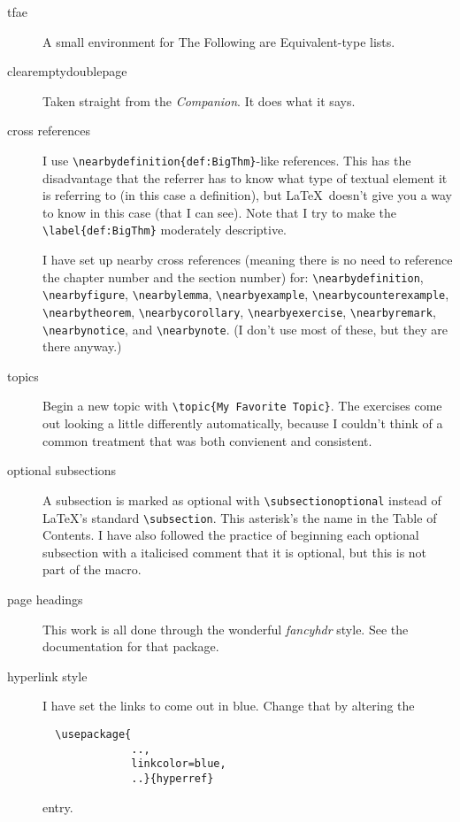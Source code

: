 \documentclass[titlepage]{article}
\makeatletter
\renewcommand{\subsection}{\@startsection{subsection}%
  {2}%
  {0em}%
  {3ex plus.25ex minus.25ex}%
  {.5ex plus .05ex minus .05ex}%
  {\bfseries\raggedright}}
\makeatother
\begin{document}
\begin{description}
  \item[tfae]
    A small environment for The Following are Equivalent-type lists.
 
  \item[clearemptydoublepage]
    Taken straight from the \textit{Companion}.
    It does what it says.

  \item[cross references]
    I use \verb!\nearbydefinition{def:BigThm}!-like references.
    This has the disadvantage that the referrer has to know what type
    of textual element it is referring to (in this case a definition),
    but \LaTeX\ doesn't give you a way to know in this case (that I can see).
    Note that I try to make the \verb!\label{def:BigThm}! moderately
    descriptive.

    I have set up nearby cross references (meaning there is no need
    to reference the chapter number and the section number) for:
    \verb!\nearbydefinition!, 
    \verb!\nearbyfigure!, 
    \verb!\nearbylemma!, 
    \verb!\nearbyexample!, 
    \verb!\nearbycounterexample!, 
    \verb!\nearbytheorem!, 
    \verb!\nearbycorollary!, 
    \verb!\nearbyexercise!, 
    \verb!\nearbyremark!, 
    \verb!\nearbynotice!, and 
    \verb!\nearbynote!.
    (I don't use most of these, but they are there anyway.)


  \item[topics]
   Begin a new
   topic with \verb|\topic{My Favorite Topic}|.
   The exercises come out looking a little differently automatically, 
   because I couldn't think of a common treatment that was both 
   convienent and consistent.

  \item[optional subsections]
    A subsection is marked as optional with \verb|\subsectionoptional|
    instead of \LaTeX's standard \verb|\subsection|.
    This asterisk's the name in the Table of Contents.
    I have also followed the practice of beginning each optional 
    subsection with a
    italicised comment that it is optional, but this is not part of the macro.


  \item[page headings]
    This work is all done through the wonderful \textit{fancyhdr} style.
    See the documentation for that package.

  \item[hyperlink style]
    I have set the links to come out in blue.
    Change that by altering the 
\begin{verbatim}
  \usepackage{
              ..,
              linkcolor=blue,
              ..}{hyperref}
\end{verbatim}
    entry.


\end{description}
\end{document}
